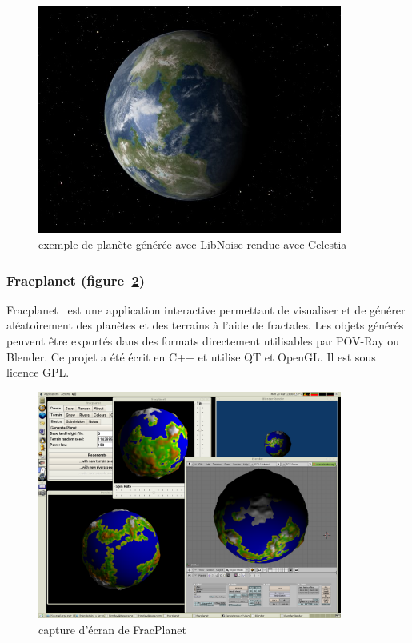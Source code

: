 \begin{figure}[!ht]
    \begin{center}
        \includegraphics[width=10cm]{resources/libnoise.jpg}
        \caption{exemple de planète générée avec LibNoise rendue avec Celestia}
        \label{fig:libnoise}
    \end{center}
\end{figure}

\subsubsection{Fracplanet (figure~\ref{fig:fracplanet})}

Fracplanet~\cite{FracPlanet} est une application interactive permettant de visualiser et de générer aléatoirement des planètes et des terrains à l'aide de fractales.
Les objets générés peuvent être exportés dans des formats directement
utilisables par POV-Ray ou Blender.
Ce projet a été écrit en C++ et utilise QT et OpenGL.
Il est sous licence GPL.

\begin{figure}[!ht]
    \begin{center}
        \includegraphics[width=10cm]{resources/fracplanet.png}
        \caption{capture d'écran de FracPlanet}
        \label{fig:fracplanet}
    \end{center}
\end{figure}

